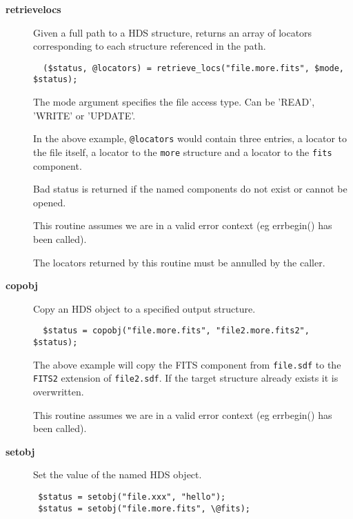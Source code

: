 \documentclass[twoside,11pt]{article}
\renewcommand{\_}{\texttt{\symbol{95}}}
\begin{document}
\begin{description}

\item[\textbf{retrieve\_locs}] \mbox{}

Given a full path to a HDS structure, returns an array of
locators corresponding to each structure referenced in the path.

\begin{verbatim}
  ($status, @locators) = retrieve_locs("file.more.fits", $mode, $status);
\end{verbatim}


The mode argument specifies the file access type. Can be 'READ', 'WRITE'
or 'UPDATE'.



In the above example, \texttt{@locators} would contain three entries,
a locator to the file itself, a locator to the \texttt{more} structure
and a locator to the \texttt{fits} component.



Bad status is returned if the named components do not exist or cannot
be opened.



This routine assumes we are in a valid error context (eg err\_begin()
has been called).



The locators returned by this routine must be annulled by the caller.


\item[\textbf{copobj}] \mbox{}

Copy an HDS object to a specified output structure.

\begin{verbatim}
  $status = copobj("file.more.fits", "file2.more.fits2", $status);
\end{verbatim}


The above example will copy the FITS component from \texttt{file.sdf} to
the \texttt{FITS2} extension of \texttt{file2.sdf}. If the target structure
already exists it is overwritten.



This routine assumes we are in a valid error context (eg err\_begin()
has been called).


\item[\textbf{setobj}] \mbox{}

Set the value of the named HDS object.

\begin{verbatim}
 $status = setobj("file.xxx", "hello");
 $status = setobj("file.more.fits", \@fits);
\end{verbatim}



\end{description}
\end{document}
